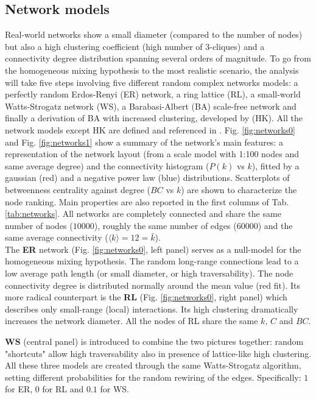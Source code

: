 \documentclass[DIV=12, BCOR=0pt]{scrartcl}  %
\begin{document}
  \subsection{Network models}
  Real-world networks show a small diameter (compared to the number of nodes) but also a high clustering coefficient (high number of 3-cliques) and a connectivity degree distribution spanning several orders of magnitude.
  To go from the homogeneous mixing hypothesis to the most realistic scenario, the analysis will take five steps involving five different random complex networks models: a perfectly random Erdos-Renyi (ER) network, a ring lattice (RL), a small-world Watts-Strogatz network (WS), a Barabasi-Albert (BA) scale-free network and finally a derivation of BA with increased clustering, developed by \citet{Holme} (HK). All the network models except HK are defined and referenced in \citet{PastorSatorras}.
  Fig. \ref{fig:networks0} and Fig. \ref{fig:networks1} show a summary of the network's main features: a representation of the network layout (from a scale model with 1:100 nodes and same average degree) and the connectivity histogram ($P(k)$ vs $k$), fitted by a gaussian (red) and a negative power law (blue) distributions.   
  Scatterplots of betweenness centrality against degree ($BC$ vs $k$) are shown to characterize the node ranking. Main properties are also reported in the first columns of Tab. \ref{tab:networks}. All networks are completely connected and share the same number of nodes ($10000$), roughly the same number of edges ($60000$) and the same average connectivity ($\langle k \rangle = 12 = \bar{k}$). \\
  
  The \textbf{ER} network (Fig. \ref{fig:networks0}, left panel) serves as a null-model for the homogeneous mixing hypothesis. The random long-range connections lead to a low average path length (or small diameter, or high traversability). The node connectivity degree is distributed normally around the mean value (red fit). 
  Its more radical counterpart is the \textbf{RL} (Fig. \ref{fig:networks0}, right panel) which describes only small-range (local) interactions. Its high clustering dramatically increases the network diameter. All the nodes of RL share the same $k$, $C$ and $BC$. 
  
  \textbf{WS} (central panel) is introduced to combine the two pictures together: random "shortcuts" allow high traversability also in presence of lattice-like high clustering. All these three models are created through the same Watts-Strogatz algorithm, setting different probabilities for the random rewiring of the edges. Specifically: $1$ for ER, $0$ for RL and $0.1$ for WS.
  
\end{document}
